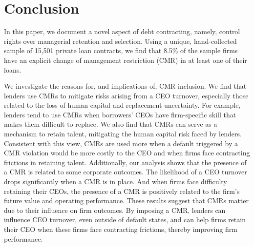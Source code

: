 \documentclass[a4paper,12pt]{article}
\begin{document}
\section{Conclusion}
\label{section:conclusion}

In this paper, we document a novel aspect of debt contracting, namely, control rights over managerial retention and selection.
Using a unique, hand-collected sample of 15,501 private loan contracts, we find that 8.5\% of the sample firms have an explicit change of management restriction (CMR) in at least one of their loans.

We investigate the reasons for, and implications of, CMR inclusion.
We find that lenders use CMRs to mitigate risks arising from a CEO turnover, especially those related to the loss of human capital and replacement uncertainty.
For example, lenders tend to use CMRs when borrowers' CEOs have firm-specific skill that makes them difficult to replace.
We also find that CMRs can serve as a mechanism to retain talent, mitigating the human capital risk faced by lenders.
Consistent with this view, CMRs are used more when a default triggered by a CMR violation would be more costly to the CEO and when firms face contracting frictions in retaining talent.
Additionally, our analysis shows that the presence of a CMR is related to some corporate outcomes.
The likelihood of a CEO turnover drops significantly when a CMR is in place.
And when firms face difficulty retaining their CEOs, the presence of a CMR is positively related to the firm's future value and operating performance.
These results suggest that CMRs matter due to their influence on firm outcomes.
By imposing a CMR, lenders can influence CEO turnover, even outside of default states, and can help firms retain their CEO when these firms face contracting frictions, thereby improving firm performance.
\end{document}
